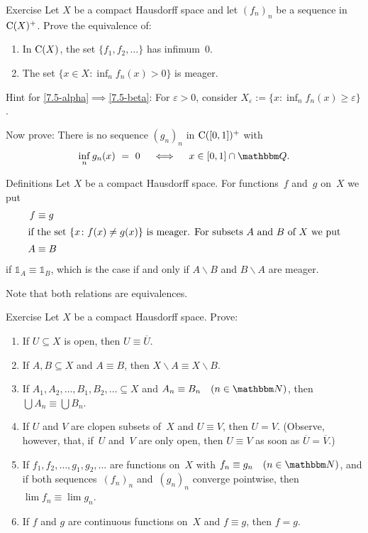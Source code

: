 \documentclass[main.tex]{subfiles}
\begin{document}
%
%
%
\begin{psec}{7.5}{Exercise}
Let $X$ be a compact Hausdorff space
and let $(f_n)_n$ be a sequence in $\mathrm{C}(X)^+$.
Prove the equivalence of:
\begin{enumerate}[label=(\greek*)]
\item\label{7.5-alpha}
In $\mathrm{C}(X)$,
the set $\{ f_1,f_2,\dotsc \}$ has infimum~$0$.
%
\item\label{7.5-beta}
The set $\{x\in X\colon \inf_n f_n(x)>0\}$ is meager.
\end{enumerate}
Hint for \ref{7.5-alpha}$\implies$\ref{7.5-beta}:
For $\varepsilon>0$,
consider $X_\varepsilon :=\{x\colon \inf_n f_n(x)\geq\varepsilon\}$.

Now prove:
There is no sequence $(g_n)_n$ in $\mathrm{C}([0,1])^+$ with
\begin{equation*}
\inf_n g_n(x)\ =\ 0 \quad\iff\quad x\in[0,1]\cap\mathbb{Q}\htam{.}
\end{equation*}
\end{psec}
%
%
\begin{psec}{7.6}{Definitions}
Let $X$ be a compact Hausdorff space.
For functions~$f$ and~$g$ on~$X$ we put
\begin{align*}
f&\equiv g \\
\shortintertext{%
if the set $\{x\colon f(x)\neq g(x)\}$ is meager.
For subsets~$A$ and~$B$ of~$X$
we put}
A&\equiv B
\end{align*}
if $\mathbb{1}_A\equiv\mathbb{1}_B$,
which is the case if and only if $A\backslash B$
and $B\backslash A$ are meager.

Note that both relations are equivalences.
\end{psec}
%
%
\begin{psec}{7.7}{Exercise}
Let $X$ be a compact Hausdorff space.
Prove:
\begin{enumerate}
\item\label{7.7-1}
If $U\subseteq X$ is open,
then $U\equiv\overline U$.
%
\item\label{7.7-2}
If $A,B\subseteq X$ and $A\equiv B$,
then $X\backslash A\equiv X\backslash B$.
%
\item\label{7.7-3}
If $A_1,A_2,\dotsc,B_1,B_2,\dotsc\subseteq X$
and $A_n\equiv B_n\quad(n\in\N)$,
then $\bigcup A_n\equiv \bigcup B_n$.
%
\item\label{7.7-4}
If $U$ and $V$ are clopen subsets of~$X$
and $U\equiv V$,
then $U=V$.
(Observe, however, that,
if~$U$ and~$V$ are only open,
then $U\equiv V$ as soon as $\overline U = \overline V$.)
%
\item\label{7.7-5}
If $f_1,f_2,\dotsc,g_1,g_2,\dotsc$ are functions on~$X$
with $f_n\equiv g_n\quad (n\in\N)$,
and if both sequences~$(f_n)_n$ and~$(g_n)_n$
converge pointwise,
then $\lim f_n\equiv \lim g_n$.
%
\item\label{7.7-6}
If $f$ and $g$ are continuous functions on~$X$
and $f\equiv g$, then $f=g$.
\end{enumerate}
\end{psec}
\end{document}
